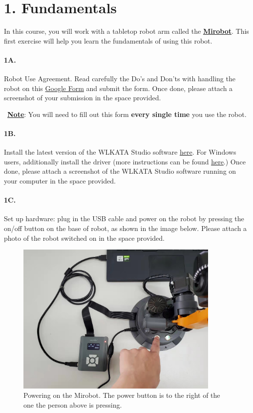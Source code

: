 \section*{1. Fundamentals}

In this course, you will work with a tabletop robot arm called the \textbf{\href{https://www.wlkata.com/products/wlkata-mirobot-introduction}{Mirobot}}.
This first exercise will help you learn the fundamentals of using this robot.

\paragraph{1A.} Robot Use Agreement. Read carefully the Do's and Don'ts with handling the robot on this \href{https://forms.gle/hHMYKivbUgeGQurR7}{Google Form} and submit the form.
Once done, please attach a screenshot of your submission in the space provided.

\danger~\textbf{\underline{Note}}: You will need to fill out this form \textbf{every single time} you use the robot.


\paragraph{1B.} Install the latest version of the WLKATA Studio software \href{https://www.wlkata.com/support/download-center }{here}. For Windows users, additionally install the driver (more instructions can be found \href{https://document.wlkata.com/?doc=/wlkata-mirobot-user-manual/12-quick-start-guide-of-mirobot/#header-three-el91d}{here}.)
Once done, please attach a screenshot of the WLKATA Studio software running on your computer in the space provided.

\paragraph{1C.} Set up hardware: plug in the USB cable and power on the robot by pressing the on/off button on the base of robot, as shown in the image below.
Please attach a photo of the robot switched on in the space provided.

\begin{figure}[H]
  \centering
  \includegraphics[width=10cm]{image/hardware_setup.jpg}
  \caption*{Powering on the Mirobot. The power button is to the right of the one the person above is pressing.}
\end{figure}

